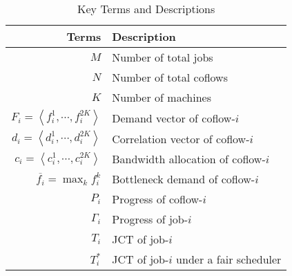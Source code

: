 \documentclass[10pt,journal,compsoc]{IEEEtran}
\begin{document}



\begin{table}
\caption{Key Terms and Descriptions}
\begin{center}
\begin{tabular}{|r|l|}
\hline
Terms & Description\\
\hline
$M$ & Number of total jobs\\
\hline
$N$ & Number of total coflows\\
\hline
$K$ & Number of machines\\
\hline
$F_i = \left\langle f_i^1,\cdots,f_i^{2K}\right\rangle$ & Demand vector of coflow-$i$\\
\hline
$d_i = \left\langle d_i^1,\cdots,d_i^{2K}\right\rangle$ & Correlation vector of coflow-$i$\\
\hline
$c_i=\left\langle c_i^1,\cdots,c_i^{2K}\right\rangle$ & Bandwidth allocation of coflow-$i$\\
\hline
$\overline{f_i}=\max_{k} f_i^k$ & Bottleneck demand of coflow-$i$\\
\hline
$P_i$ & Progress of coflow-$i$\\
\hline
$\Gamma_i$ & Progress of job-$i$\\
\hline
$T_i$ & JCT of job-$i$\\
\hline
$T_i^*$ & JCT of job-$i$ under a fair scheduler\\
\hline
\end{tabular}
\end{center}
\end{table}
\end{document}
